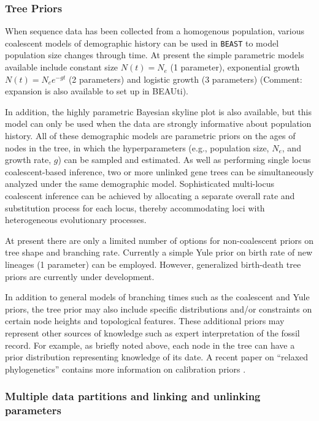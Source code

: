 \documentclass[cup7b, english]{cupbook}
\begin{document}
\subsubsection{Tree Priors}

When sequence data has been collected from a homogenous population,
various coalescent \cite{Kingman1982,GT1994} models of demographic
history can be used in \texttt{BEAST} to model population size changes through
time. At present the simple parametric models available include constant
size $N(t)=N_{e}$ (1 parameter), exponential growth $N(t)=N_{e}e^{-gt}$
(2 parameters) and logistic growth (3 parameters) (Comment: expansion is also available to set up in BEAUti).

In addition, the highly parametric Bayesian skyline plot \cite{DRSP2005}
is also available, but this model can only be used when the data are
strongly informative about population history. All of these demographic
models are parametric priors on the ages of nodes in the tree, in
which the hyperparameters (e.g., population size, $N_{e}$, and growth
rate, $g$) can be sampled and estimated. As well as performing single
locus coalescent-based inference, two or more unlinked gene trees
can be simultaneously analyzed under the same demographic model. Sophisticated
multi-locus coalescent inference can be achieved by allocating a separate
overall rate and substitution process for each locus, thereby accommodating
loci with heterogeneous evolutionary processes.

At present there are only a limited number of options for non-coalescent
priors on tree shape and branching rate. Currently a simple Yule prior
on birth rate of new lineages (1 parameter) can be employed. However,
generalized birth-death tree priors are currently under development.

In addition to general models of branching times such as the coalescent
and Yule priors, the tree prior may also include specific distributions
and/or constraints on certain node heights and topological features.
These additional priors may represent other sources of knowledge such
as expert interpretation of the fossil record. For example, as briefly
noted above, each node in the tree can have a prior distribution representing
knowledge of its date. A recent paper on ``relaxed phylogenetics''
contains more information on calibration priors \cite{DHPR2006}.

\subsubsection{Multiple data partitions and linking and unlinking parameters}
\end{document}
